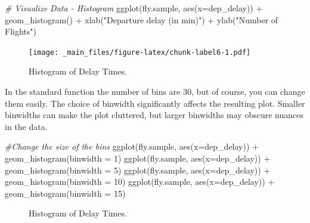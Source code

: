 \documentclass[
]{book}
\newenvironment{Shaded}{\begin{snugshade}}{\end{snugshade}}
\newcommand{\AttributeTok}[1]{\textcolor[rgb]{0.77,0.63,0.00}{#1}}
\newcommand{\CommentTok}[1]{\textcolor[rgb]{0.56,0.35,0.01}{\textit{#1}}}
\newcommand{\DecValTok}[1]{\textcolor[rgb]{0.00,0.00,0.81}{#1}}
\newcommand{\FunctionTok}[1]{\textcolor[rgb]{0.00,0.00,0.00}{#1}}
\newcommand{\NormalTok}[1]{#1}
\newcommand{\SpecialCharTok}[1]{\textcolor[rgb]{0.00,0.00,0.00}{#1}}
\newcommand{\StringTok}[1]{\textcolor[rgb]{0.31,0.60,0.02}{#1}}
\begin{document}
\begin{Shaded}
\begin{Highlighting}[]
\CommentTok{\# Visualize Data {-} Histogram}
\FunctionTok{ggplot}\NormalTok{(fly.sample, }\FunctionTok{aes}\NormalTok{(}\AttributeTok{x=}\NormalTok{dep\_delay)) }\SpecialCharTok{+} \FunctionTok{geom\_histogram}\NormalTok{() }\SpecialCharTok{+}
  \FunctionTok{xlab}\NormalTok{(}\StringTok{"Departure delay (in min)"}\NormalTok{) }\SpecialCharTok{+} \FunctionTok{ylab}\NormalTok{(}\StringTok{"Number of Flights"}\NormalTok{)  }
\end{Highlighting}
\end{Shaded}

\begin{figure}
\centering
\texttt{[image: \_main\_files/figure-latex/chunk-label6-1.pdf]}
\caption{\label{fig:chunk-label6}Histogram of Delay Times.}
\end{figure}

In the standard function the number of bins are 30, but of course, you can change them easily. The choice of binwidth significantly affects the resulting plot. Smaller binwidths can make the plot cluttered, but larger binwidths may obscure nuances in the data.

\begin{Shaded}
\begin{Highlighting}[]
\CommentTok{\#Change the size of the bins}
\FunctionTok{ggplot}\NormalTok{(fly.sample, }\FunctionTok{aes}\NormalTok{(}\AttributeTok{x=}\NormalTok{dep\_delay)) }\SpecialCharTok{+} \FunctionTok{geom\_histogram}\NormalTok{(}\AttributeTok{binwidth =} \DecValTok{1}\NormalTok{) }
\FunctionTok{ggplot}\NormalTok{(fly.sample, }\FunctionTok{aes}\NormalTok{(}\AttributeTok{x=}\NormalTok{dep\_delay)) }\SpecialCharTok{+} \FunctionTok{geom\_histogram}\NormalTok{(}\AttributeTok{binwidth =} \DecValTok{5}\NormalTok{) }
\FunctionTok{ggplot}\NormalTok{(fly.sample, }\FunctionTok{aes}\NormalTok{(}\AttributeTok{x=}\NormalTok{dep\_delay)) }\SpecialCharTok{+} \FunctionTok{geom\_histogram}\NormalTok{(}\AttributeTok{binwidth =} \DecValTok{10}\NormalTok{) }
\FunctionTok{ggplot}\NormalTok{(fly.sample, }\FunctionTok{aes}\NormalTok{(}\AttributeTok{x=}\NormalTok{dep\_delay)) }\SpecialCharTok{+} \FunctionTok{geom\_histogram}\NormalTok{(}\AttributeTok{binwidth =} \DecValTok{15}\NormalTok{)}
\end{Highlighting}
\end{Shaded}

\begin{figure}

{\centering {}\newline{}

}

\caption{Histogram of Delay Times.}\label{fig:chunk-label7}
\end{figure}
\end{document}
